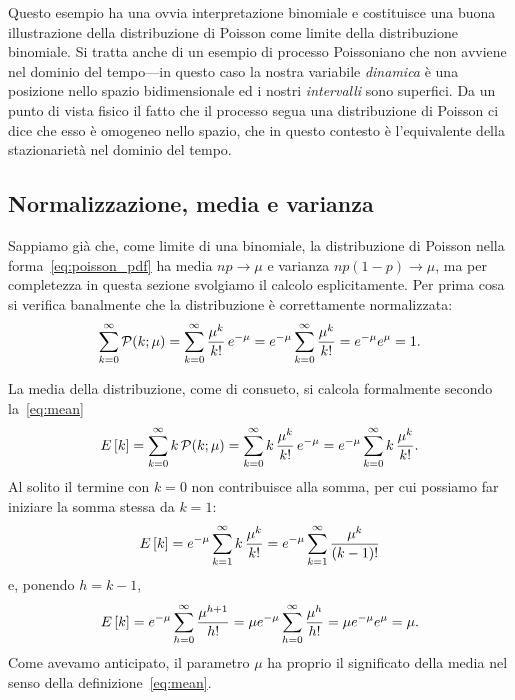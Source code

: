 Questo esempio ha una ovvia interpretazione binomiale e costituisce una
buona illustrazione della distribuzione di Poisson come limite della
distribuzione binomiale. Si tratta anche di un esempio di processo Poissoniano
che non avviene nel dominio del tempo---in questo caso la nostra variabile
\emph{dinamica} è una posizione nello spazio bidimensionale ed i nostri
\emph{intervalli} sono superfici. Da un punto di vista fisico il fatto che
il processo segua una distribuzione di Poisson ci dice che esso è omogeneo
nello spazio, che in questo contesto è l'equivalente della stazionarietà
nel dominio del tempo.


\subsection{Normalizzazione, media e varianza}

Sappiamo già che, come limite di una binomiale, la distribuzione di Poisson
nella forma~\eqref{eq:poisson_pdf} ha media $np \rightarrow \mu$ e
varianza $np(1 - p) \rightarrow \mu$, ma per completezza in questa sezione
svolgiamo il calcolo esplicitamente. Per prima cosa si verifica banalmente che
la distribuzione è correttamente normalizzata:
\begin{align*}
  \sum_{k=0}^\infty \poissonpdf[\mu]{k} =
  \sum_{k=0}^\infty \frac{\mu^k}{k!} \, e^{-\mu} =
  e^{-\mu} \sum_{k=0}^\infty \frac{\mu^k}{k!} = e^{-\mu} e^\mu = 1.
\end{align*}

La media della distribuzione, come di consueto, si calcola formalmente secondo
la~\eqref{eq:mean}
\begin{align*}
  \expect{k} = \sum_{k=0}^\infty k\,\poissonpdf[\mu]{k} =
  \sum_{k=0}^\infty k\,\frac{\mu^k}{k!}\,e^{-\mu} =
  e^{-\mu} \sum_{k=0}^\infty k\,\frac{\mu^k}{k!}.
\end{align*}
Al solito il termine con $k = 0$ non contribuisce alla somma, per cui
possiamo far iniziare la somma stessa da $k = 1$:
\begin{align*}
  \displaystyle E\left[k\right] = e^{-\mu} \sum_{k=1}^\infty k\,\frac{\mu^k}{k!} =
  e^{-\mu} \sum_{k=1}^\infty \frac{\mu^k}{(k - 1)!}
\end{align*}
e, ponendo $h = k - 1$,
\begin{align*}
  \displaystyle E\left[k\right] = e^{-\mu} \sum_{h=0}^\infty \frac{\mu^{h + 1}}{h!} =
  \mu e^{-\mu} \sum_{h=0}^\infty \frac{\mu^{h}}{h!} =
  \mu e^{-\mu} e^{\mu} = \mu.
\end{align*}
Come avevamo anticipato, il parametro $\mu$ ha proprio il significato della
media nel senso della definizione~\eqref{eq:mean}.

